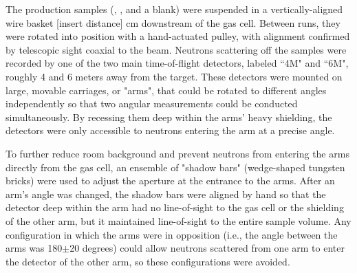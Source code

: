 \begin{table}[ht]
The production samples (\snTwelve, \snFour, and a blank) were suspended in a
vertically-aligned wire basket [insert distance] cm
downstream of the gas cell. Between runs, they were rotated into position
with a hand-actuated pulley, with
alignment confirmed by telescopic sight coaxial to the beam.
Neutrons scattering off the samples were recorded by one of the two main time-of-flight
detectors, labeled ``4M" and ``6M", roughly 4 and 6 meters away from the target.
These detectors were mounted on large, movable carriages, or "arms",
that could be rotated to different angles independently so that two angular
measurements could be conducted simultaneously. By recessing them deep within
the arms' heavy shielding, the detectors were only accessible to neutrons
entering the arm at a precise angle.


To further reduce room background and prevent neutrons from entering the arms directly
from the gas cell, an ensemble of "shadow bars" (wedge-shaped tungsten bricks)
were used to adjust the aperture at the entrance to the arms. After an arm's
angle was changed, the shadow bars were aligned by hand so that the
detector deep within the arm had no line-of-sight to the gas cell or the
shielding of the other arm, but it maintained line-of-sight to the entire sample volume. Any 
configuration in which the arms were in opposition (i.e., the
angle between the arms was 180$\pm$20 degrees) could allow neutrons scattered
from one arm to enter the detector of the other arm, so these
configurations were avoided.


\end{table}
